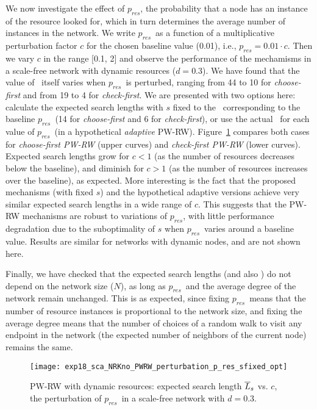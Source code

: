 \documentclass[]{elsarticle}
\newcommand{\pnoderes}  {\ensuremath{p_{res}}}
\begin{document}
We now investigate the effect of \pnoderes, the probability that a node has an instance of the resource looked for, which in turn determines the average number of instances in the network. We write \pnoderes\ as a function of a multiplicative perturbation factor $c$ for the chosen baseline value (0.01), i.e., $\pnoderes=0.01\cdot c$. Then we vary $c$ in the range [0.1, 2] and observe the performance of the mechamisms in a scale-free network with dynamic resources ($d=0.3$). We have found that the value of \sopt\ itself varies when \pnoderes\ is perturbed, ranging from 44 to 10 for \emph{choose-first} and from 19 to 4 for \emph{check-first}. We are presented with two options here: calculate the expected search lengths with $s$ fixed to the \sopt\ corresponding to the baseline \pnoderes\ (14 for \emph{choose-first} and 6 for \emph{check-first}), or use the actual \sopt\ for each value of \pnoderes\ (in a hypothetical \emph{adaptive} PW-RW). Figure~\ref{fig:scalefree_perturbation_pres_dynres} compares both cases for \emph{choose-first PW-RW} (upper curves) and \emph{check-first PW-RW} (lower curves). Expected search lengths grow for $c<1$ (as the number of resources decreases below the baseline), and diminish for $c>1$ (as the number of resources increases over the baseline), as expected. More interesting is the fact that the proposed mechanisms (with fixed $s$) and the hypothetical adaptive versions achieve very similar expected search lengths in a wide range of $c$. This suggests that the PW-RW mechanisms are robust to variations of \pnoderes, with little performance degradation due to the suboptimality of $s$ when \pnoderes\ varies around a baseline value. Results are similar for networks with dynamic nodes, and are not shown here.

Finally, we have checked that the expected search lengths (and also \sopt) do not depend on the network size ($N$), as long as \pnoderes\ and the average degree of the network remain unchanged. This is as expected, since fixing \pnoderes\ means that the number of resource instances is proportional to the network size, and fixing the average degree means that the number of choices of a random walk to visit any endpoint in the network (the expected number of neighbors of the current node) remains the same.

\begin{figure}
 \centering
 \texttt{[image: exp18\_sca\_NRKno\_PWRW\_perturbation\_p\_res\_sfixed\_opt]}
 \caption{PW-RW with dynamic resources: expected search length $\overline{L}_s$ vs. $c$, the perturbation of \pnoderes\ in a scale-free network with $d=0.3$.}
 \label{fig:scalefree_perturbation_pres_dynres}
\end{figure}
\end{document}
